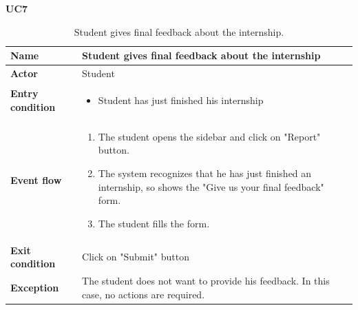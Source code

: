     \textbf{UC7}
    \nopagebreak
    \begin{table}[H]
        \centering
        \begin{tabular}{|l|p{11.9cm}|}
        \hline
        \textbf{Name}            & Student gives final feedback about the internship \\\hline
        \textbf{Actor}           & Student     \\\hline
        \textbf{Entry condition} &
        \begin{itemize}
              \item Student has just finished his internship
        \end{itemize}                                        \\\hline
        \textbf{Event flow}      &
        \begin{enumerate}[label=\arabic*.]
              \item The student opens the sidebar and click on "Report" button.
              \item The system recognizes that he has just finished an internship, so shows the "Give us your final feedback" form.
              \item The student fills the form.
              
        \end{enumerate}            \\\hline
        \textbf{Exit condition}  & Click on "Submit" button  \\\hline
        \textbf{Exception}       &  The student does not want to provide his feedback. In this case, no actions are required.   \\\hline
        \end{tabular}
        \caption{Student gives final feedback about the internship.}
        \label{table:Student gives final feedback about the internship}
    \end{table}

